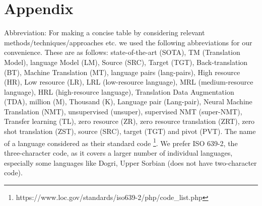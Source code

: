 \documentclass[manuscript,screen]{acmart}
\begin{document}
\section{Appendix}

Abbreviation: 
For making a concise table by considering relevant methods/techniques/approaches etc. we used the following abbreviations for our convenience. These are as follows: state-of-the-art (SOTA), TM (Translation Model), language Model (LM), Source (SRC), Target (TGT), Back-translation (BT), Machine Translation (MT), language pairs (lang-pairs), High resource (HR), Low resource (LR), LRL (low-resource language), MRL (medium-resource language), HRL (high-resource language), Translation Data Augmentation (TDA), million (M), Thousand (K), Language pair (Lang-pair), Neural Machine Translation (NMT), unsupervised (unsuper), supervised NMT (super-NMT), Transfer learning (TL), zero resource (ZR), zero resource translation (ZRT), zero shot translation (ZST), source (SRC), target (TGT) and pivot (PVT).
The name of a language considered as their standard code \footnote{https://www.loc.gov/standards/iso639-2/php/code\_list.php}. We prefer ISO 639-2, the three-character code, as it covers a larger number of individual languages, especially some languages like Dogri, Upper Sorbian (does not have two-character code).

\end{document}
